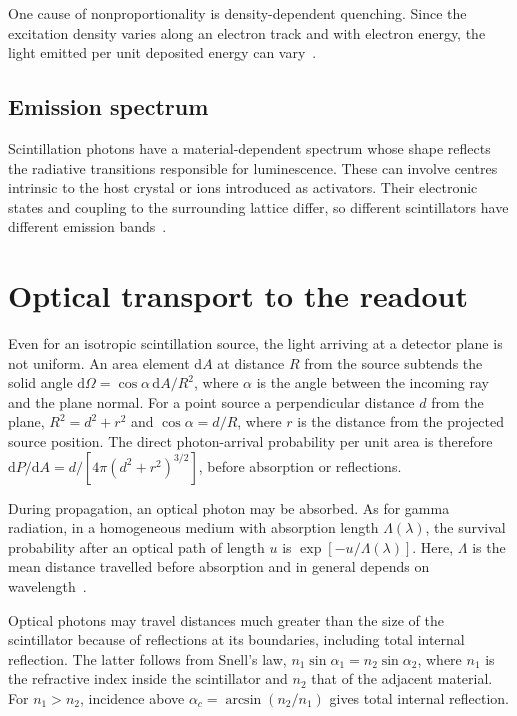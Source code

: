 One cause of nonproportionality is density-dependent quenching. Since the excitation density varies along an electron track and with electron energy, the light emitted per unit deposited energy can vary~\parencite[section III]{payne2009nonproportionality}.

\subsection{Emission spectrum}

Scintillation photons have a material-dependent spectrum whose shape reflects the radiative transitions responsible for luminescence. These can involve centres intrinsic to the host crystal or ions introduced as activators. Their electronic states and coupling to the surrounding lattice differ, so different scintillators have different emission bands~\parencite{prange2013excitations}.

\section{Optical transport to the readout}

Even for an isotropic scintillation source, the light arriving at a detector plane is not uniform. An area element $\mathrm{d}A$ at distance $R$ from the source subtends the solid angle $\mathrm{d}\Omega=\cos\alpha\,\mathrm{d}A/R^2$, where $\alpha$ is the angle between the incoming ray and the plane normal. For a point source a perpendicular distance $d$ from the plane, $R^2=d^2+r^2$ and $\cos\alpha=d/R$, where $r$ is the distance from the projected source position. The direct photon-arrival probability per unit area is therefore $\mathrm{d}P/\mathrm{d}A=d/[4\pi(d^2+r^2)^{3/2}]$, before absorption or reflections.

During propagation, an optical photon may be absorbed. As for gamma radiation, in a homogeneous medium with absorption length $\Lambda(\lambda)$, the survival probability after an optical path of length $u$ is $\exp[-u/\Lambda(\lambda)]$. Here, $\Lambda$ is the mean distance travelled before absorption and in general depends on wavelength~\parencite[fig.~8]{miller2025material}.

Optical photons may travel distances much greater than the size of the scintillator because of reflections at its boundaries, including total internal reflection. The latter follows from Snell's law, $n_1\sin\alpha_1=n_2\sin\alpha_2$, where $n_1$ is the refractive index inside the scintillator and $n_2$ that of the adjacent material. For $n_1>n_2$, incidence above $\alpha_c=\arcsin(n_2/n_1)$ gives total internal reflection.

